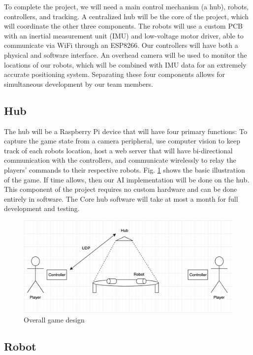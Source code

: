 \documentclass[11pt]{ieeeconf}
\begin{document}
To complete the project, we will need a main control mechanism (a hub), robots, controllers, and tracking. A centralized hub will be the core of the project, which will coordinate the other three components. The robots will use a custom PCB with an inertial measurement unit (IMU) and low-voltage motor driver, able to communicate via WiFi through an ESP8266. Our controllers will have both a physical and software interface. An overhead camera will be used to monitor the locations of our robots, which will be combined with IMU data for an extremely accurate positioning system. Separating these four components allows for simultaneous development by our team members.

\subsection{Hub}

The hub will be a Raspberry Pi device that will have four primary functions: To capture the game state from a camera peripheral, use computer vision to keep track of each robots location, host a web server that will have bi-directional communication with the controllers, and communicate wirelessly to relay the players' commands to their respective robots. Fig. \ref{Illustration} shows the basic illustration of the game. If time allows, then our AI implementation will be done on the hub. This component of the project requires no custom hardware and can be done entirely in software. The Core hub software will take at most a month for full development and testing. 

 \begin{figure}[!t]
  \centering
  \captionsetup{justification=centering}
      \includegraphics[width=14cm]{images/Overall.png}
        \caption{Overall game design}
        \label{Illustration}
\end{figure}

\subsection{Robot}
\end{document}
